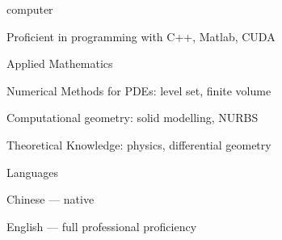 
\begin{cvskills}
  \cvskill
    {computer} %
    {
      \begin{cvitems} %
        \item {Proficient in programming with C++, Matlab, CUDA}
      \end{cvitems}
    } %

    \cvskill
    {Applied Mathematics} %
    {
      \begin{cvitems} %
        \item {Numerical Methods for PDEs: level set, finite volume}
        \item {Computational geometry: solid modelling, NURBS}
        \item {Theoretical Knowledge: physics, differential geometry}
      \end{cvitems}
    } %
    
  \cvskill
    {Languages} %
    {
      \begin{cvitems} %
        \item {Chinese --- native}
        \item {English --- full professional proficiency}
      \end{cvitems}
    } %
\end{cvskills}
